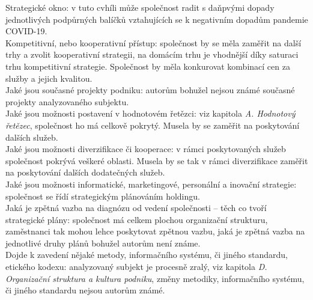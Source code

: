 Strategické okno: v tuto cvhíli může společnost radit s daňpvými dopady jednotlivých podpůrných balíčků vztahujících se k negativním dopadům pandemie COVID-19.\\

Kompetitivní, nebo kooperativní přístup: společnost by se měla zaměřit na další trhy a zvolit kooperativní strategii, na domácím trhu je vhodnější díky saturaci trhu kompetitivní strategie. Společnost by měla konkurovat kombinací cen za služby a jejich kvalitou.\\

Jaké jsou současné projekty podniku: autorům bohužel nejsou známé současné projekty analyzovaného subjektu.\\

Jaké jsou možnosti postavení v hodnotovém řetězci: viz kapitola \textit{A. Hodnotový řetězec}, společnost ho má celkově pokrytý. Musela by se zaměřit na poskytování dalších služeb.\\

Jaké jsou možnosti diverzifikace či kooperace: v rámci poskytovaných služeb společnost pokrývá veškeré oblasti. Musela by se tak v rámci diverzifikace zaměřit na poskytování dalších dodatečných služeb.\\

Jaké jsou možnosti informatické, marketingové, personální a inovační strategie: společnost se řídí strategickým plánováním holdingu.\\

Jaká je zpětná vazba na diagnózu od vedení společnosti – těch co tvoří strategické plány: společnost má celkem plochou organizační strukturu, zaměstnanci tak mohou lehce poskytovat zpětnou vazbu, jaká je zpětná vazba na jednotlivé druhy plánů bohužel autorům není známe.\\

Dojde k zavedení nějaké metody, informačního systému, či jiného standardu, etického kodexu: analyzovaný subjekt je procesně zralý, viz kapitola \textit{D. Organizační struktura a kultura podniku}, změny metodiky, informačního systému, či jiného standardu nejsou autorům známé.\\